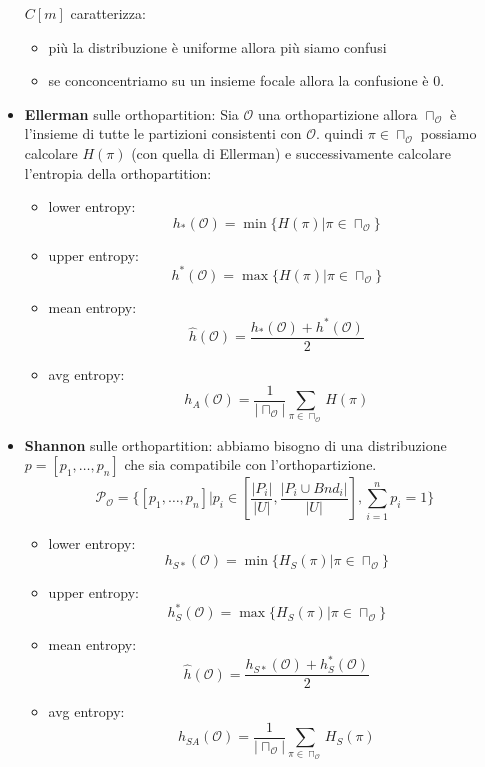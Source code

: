 \begin{itemize}
    $C[m]$ caratterizza:
    \begin{itemize}
        \item più la distribuzione è uniforme allora più siamo confusi
        \item se conconcentriamo su un insieme focale allora la confusione è $0$.
    \end{itemize}
    \item \textbf{Ellerman} sulle orthopartition: Sia $\mathcal{O}$ una orthopartizione 
    allora $\sqcap_\mathcal{O}$ è l'insieme di tutte le partizioni consistenti con $\mathcal{O}$.
    quindi $\pi \in \sqcap_\mathcal{O}$ possiamo calcolare $H(\pi)$ (con quella di Ellerman) e successivamente 
    calcolare l'entropia della orthopartition:
    \begin{itemize}
        \item lower entropy:
        $$h_\ast(\mathcal{O}) = \min\{H(\pi)|\pi \in \sqcap_\mathcal{O}\}$$
        \item upper entropy:
        $$h^\ast(\mathcal{O}) = \max\{H(\pi)|\pi \in \sqcap_\mathcal{O}\}$$
        \item mean entropy:
        $$\hat{h}(\mathcal{O}) = \frac{h_\ast(\mathcal{O}) + h^\ast(\mathcal{O})}{2}$$
        \item avg entropy:
        $$h_A(\mathcal{O})= \frac{1}{|\sqcap_\mathcal{O}|}\sum_{\pi \in \sqcap_\mathcal{O}}H(\pi)$$
    \end{itemize}
    \item \textbf{Shannon} sulle orthopartition: abbiamo bisogno di una distribuzione 
    $p=\left[p_1,\dots,p_n\right]$ che sia compatibile con l'orthopartizione.
    $$\mathcal{P}_\mathcal{O} = \{\left[p_1,\dots, p_n\right] | p_i\in \left[\frac{|P_i|}{|U|},\frac{|P_i\cup Bnd_i|}{|U|}\right], \sum_{i=1}^{n}p_i=1\}$$
    \begin{itemize}
        \item lower entropy:
        $$h_{S\ast}(\mathcal{O}) = \min\{H_S(\pi)|\pi \in \sqcap_\mathcal{O}\}$$
        \item upper entropy:
        $$h_S^\ast(\mathcal{O}) = \max\{H_S(\pi)|\pi \in \sqcap_\mathcal{O}\}$$
        \item mean entropy:
        $$\hat{h}(\mathcal{O}) = \frac{h_{S\ast}(\mathcal{O}) + h_S^\ast(\mathcal{O})}{2}$$
        \item avg entropy:
        $$h_{SA}(\mathcal{O})= \frac{1}{|\sqcap_\mathcal{O}|}\sum_{\pi \in \sqcap_\mathcal{O}}H_S(\pi)$$
    \end{itemize}
\end{itemize}


